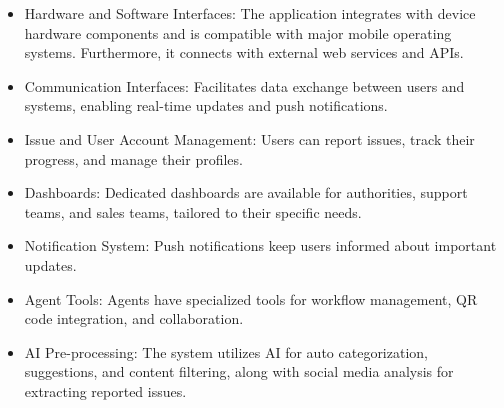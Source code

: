 \begin{itemize}
    \item Hardware and Software Interfaces: The application integrates with device hardware components and is compatible with major mobile operating systems. Furthermore, it connects with external web services and APIs.
    \item Communication Interfaces: Facilitates data exchange between users and systems, enabling real-time updates and push notifications.
    \item Issue and User Account Management: Users can report issues, track their progress, and manage their profiles.
    \item Dashboards: Dedicated dashboards are available for authorities, support teams, and sales teams, tailored to their specific needs.
    \item Notification System: Push notifications keep users informed about important updates.
    \item Agent Tools: Agents have specialized tools for workflow management, QR code integration, and collaboration.
    \item AI Pre-processing: The system utilizes AI for auto categorization, suggestions, and content filtering, along with social media analysis for extracting reported issues.
\end{itemize}